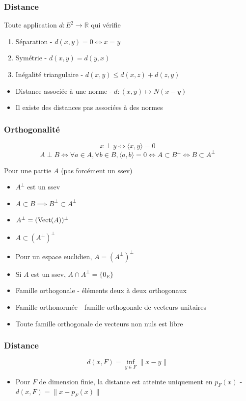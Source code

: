 \documentclass[openany]{book}
\begin{document}
\subsubsection{Distance}
Toute application $d : E^2 \rightarrow \mathbb{R}$ qui vérifie
\begin{enumerate}
    \item Séparation - $d(x, y) = 0 \iff x = y$
    \item Symétrie - $d(x,y) = d(y, x)$
    \item Inégalité triangulaire - $d(x, y) \leq d(x, z) + d(z, y)$
\end{enumerate}

\begin{itemize}
    \item Distance associée à une norme - $d: (x, y) \mapsto N(x-y)$
    \item Il existe des distances pas associées à des normes
\end{itemize}

\subsubsection{Orthogonalité}
\[ x \perp y \iff \langle x, y \rangle = 0 \]
\[ A \perp B \iff \forall a \in A, \forall b \in B, \langle a, b \rangle = 0 \iff A \subset B^{\perp} \iff B \subset A^{\perp} \]

Pour une partie $A$ (pas forcément un ssev)
\begin{itemize}
    \item $A^{\perp}$ est un ssev
    \item $A \subset B \implies B^{\perp} \subset A^{\perp}$
    \item $A^{\perp} = (\text{Vect} (A))^{\perp}$
    \item $A \subset (A^{\perp})^{\perp}$
    \item Pour un espace euclidien, $A = (A^{\perp})^{\perp}$
    \item Si $A$ est un ssev, $A \cap A^{\perp} = \{0_E\}$
    \item Famille orthogonale - éléments deux à deux orthogonaux
    \item Famille orthonormée - famille orthogonale de vecteurs unitaires
    \item Toute famille orthogonale de vecteurs non nuls est libre
\end{itemize}

\subsubsection{Distance}
\[ d(x, F) = \underset{y \in F}{\inf} \| x-y \| \]
\begin{itemize}
    \item Pour $F$ de dimension finie, la distance est atteinte uniquement en $p_F(x)$ - $d(x, F) = \|x-p_F(x)\|$
\end{itemize}
\end{document}
